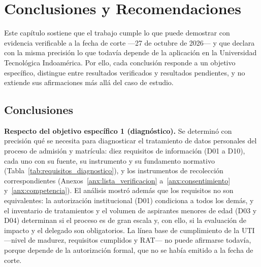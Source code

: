 \chapter{Conclusiones y Recomendaciones}
\label{chap:conclusiones}

Este capítulo sostiene que el trabajo cumple lo que puede demostrar con evidencia verificable a la fecha de corte ---27 de octubre de 2026--- y que declara con la misma precisión lo que todavía depende de la aplicación en la Universidad Tecnológica Indoamérica. Por ello, cada conclusión responde a un objetivo específico, distingue entre resultados verificados y resultados pendientes, y no extiende sus afirmaciones más allá del caso de estudio.

\section{Conclusiones}

\textbf{Respecto del objetivo específico 1 (diagnóstico).} Se determinó con precisión qué se necesita para diagnosticar el tratamiento de datos personales del proceso de admisión y matrícula: diez requisitos de información (D01 a D10), cada uno con su fuente, su instrumento y su fundamento normativo (Tabla~\ref{tab:requisitos_diagnostico}), y los instrumentos de recolección correspondientes (Anexos~\ref{anx:lista_verificacion} a~\ref{anx:consentimiento} y~\ref{anx:competencia}). El análisis mostró además que los requisitos no son equivalentes: la autorización institucional (D01) condiciona a todos los demás, y el inventario de tratamientos y el volumen de aspirantes menores de edad (D03 y D04) determinan si el proceso es de gran escala y, con ello, si la evaluación de impacto y el delegado son obligatorios. La línea base de cumplimiento de la UTI ---nivel de madurez, requisitos cumplidos y RAT--- no puede afirmarse todavía, porque depende de la autorización formal, que no se había emitido a la fecha de corte.

